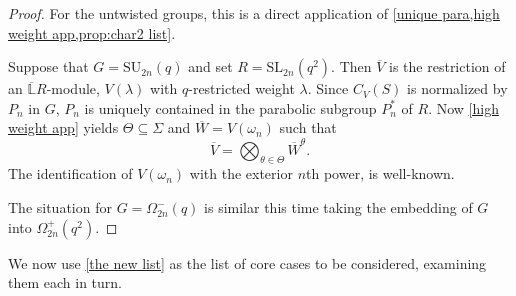 \documentclass[12pt]{amsart}
\theoremstyle{remark}
\theoremstyle{notation}
\theoremstyle{definition}
\newcommand{\SU}{\mathrm{SU}}
\newcommand{\SL}{\mathrm{SL}}
\newcommand{\0}{\emptyset}
\begin{document}
\begin{proof} For the untwisted groups, this is a direct application of \cref{unique para,high weight app,prop:char2 list}.

Suppose that $G=\SU_{2n}(q)$ and set $R=\SL_{2n}(q^{2})$.
Then $\overline V$ is the restriction of an $\overline{\mathbb L}R$-module,   $V(\lambda)$ with $q$-restricted weight $\lambda$. Since $C_V(S)$ is normalized by $P_n$ in $G$, $P_n$ is uniquely contained in the parabolic subgroup $P_n^*$ of $R$. Now \cref{high weight app} yields $\Theta \subseteq \Sigma$ and $\overline{W}= V(\omega_n)$ such that
$$\overline V= \bigotimes_{\theta \in \Theta} \overline{W}^\theta.$$
The identification of $V(\omega_n)$ with the exterior $n$th power, is well-known.


The situation for $G=\Omega_{2n}^-(q)$ is similar this time taking the embedding of $G$ into $\Omega_{2n}^+(q^{2})$.
\end{proof}



We now use \cref{the new list} as the list of core cases to be considered, examining them each in turn.
\end{document}
